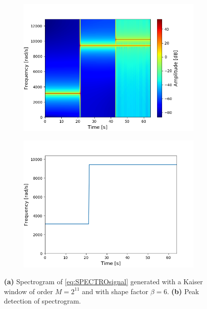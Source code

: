 \begin{figure}[H]
\centering
\begin{subfigure}{0.49\textwidth}
\centering
\includegraphics[width=\textwidth]{figures/validation/stft/peak/spectro2048.png}
\caption{}
\end{subfigure}
\begin{subfigure}{0.49\textwidth}
\centering
\includegraphics[width=\textwidth]{figures/validation/stft/peak/peak2048.png}
\caption{}
\end{subfigure}
\caption{\textbf{(a)} Spectrogram of \ref{eq:SPECTROsignal} generated with a Kaiser window of order $M=2^{11}$ and with shape factor $\beta=6$. \textbf{(b)} Peak detection of spectrogram.}
\label{fig:2048}
\end{figure}
